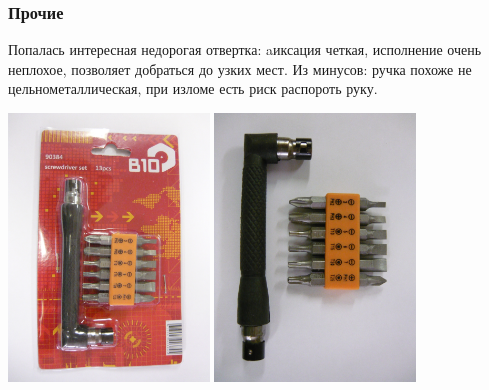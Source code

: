 \subsubsection{Прочие}

Попалась интересная недорогая отвертка: aиксация четкая, исполнение очень
неплохое, позволяет добраться до узких мест. Из минусов: ручка похоже не
цельнометаллическая, при изломе есть риск распороть руку.

\bigskip
\noindent\includegraphics[width=0.4\textwidth]{tech/tools/P1020966.jpg}
\noindent\includegraphics[width=0.4\textwidth]{tech/tools/P1020967.jpg}
\clearpage
